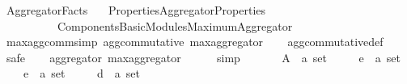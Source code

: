 %
\begin{isabellebody}%
%
%
\isadelimtheory
%
\endisadelimtheory
%
\isatagtheory
{}\isamarkupfalse%
\ Aggregator{\isacharunderscore}{\kern0pt}Facts\isanewline
\ \ \ {\isachardoublequoteopen}{\isachardot}{\kern0pt}{\isachardot}{\kern0pt}{\isacharslash}{\kern0pt}Properties{\isacharslash}{\kern0pt}Aggregator{\isacharunderscore}{\kern0pt}Properties{\isachardoublequoteclose}\isanewline
\ \ \ \ \ \ \ \ \ \ {\isachardoublequoteopen}{\isachardot}{\kern0pt}{\isachardot}{\kern0pt}{\isacharslash}{\kern0pt}Components{\isacharslash}{\kern0pt}Basic{\isacharunderscore}{\kern0pt}Modules{\isacharslash}{\kern0pt}Maximum{\isacharunderscore}{\kern0pt}Aggregator{\isachardoublequoteclose}\isanewline
\isanewline
{}%
\endisatagtheory
{\isafoldtheory}%
%
\isadelimtheory
\isanewline
%
\endisadelimtheory
\isanewline
\isanewline
{}\isamarkupfalse%
\ max{\isacharunderscore}{\kern0pt}agg{\isacharunderscore}{\kern0pt}comm{\isacharbrackleft}{\kern0pt}simp{\isacharbrackright}{\kern0pt}{\isacharcolon}{\kern0pt}\ {\isachardoublequoteopen}agg{\isacharunderscore}{\kern0pt}commutative\ max{\isacharunderscore}{\kern0pt}aggregator{\isachardoublequoteclose}\isanewline
%
\isadelimproof
\ \ %
\endisadelimproof
%
\isatagproof
{}\isamarkupfalse%
\ agg{\isacharunderscore}{\kern0pt}commutative{\isacharunderscore}{\kern0pt}def\isanewline
{}\isamarkupfalse%
\ {\isacharparenleft}{\kern0pt}safe{\isacharparenright}{\kern0pt}\isanewline
\ \ \isamarkupfalse%
\ {\isachardoublequoteopen}aggregator\ max{\isacharunderscore}{\kern0pt}aggregator{\isachardoublequoteclose}\isanewline
\ \ \ \ \isamarkupfalse%
\ simp\isanewline
{}\isamarkupfalse%
\isanewline
\ \ \isamarkupfalse%
\isanewline
\ \ \ \ A\ {\isacharcolon}{\kern0pt}{\isacharcolon}{\kern0pt}\ {\isachardoublequoteopen}{\isacharprime}{\kern0pt}a\ set{\isachardoublequoteclose}\ \isanewline
\ \ \ \ e{}\ {\isacharcolon}{\kern0pt}{\isacharcolon}{\kern0pt}\ {\isachardoublequoteopen}{\isacharprime}{\kern0pt}a\ set{\isachardoublequoteclose}\ \isanewline
\ \ \ \ e{}\ {\isacharcolon}{\kern0pt}{\isacharcolon}{\kern0pt}\ {\isachardoublequoteopen}{\isacharprime}{\kern0pt}a\ set{\isachardoublequoteclose}\ \isanewline
\ \ \ \ d{}\ {\isacharcolon}{\kern0pt}{\isacharcolon}{\kern0pt}\ {\isachardoublequoteopen}{\isacharprime}{\kern0pt}a\ set{\isachardoublequoteclose}\ \isanewline

\end{isabellebody}
